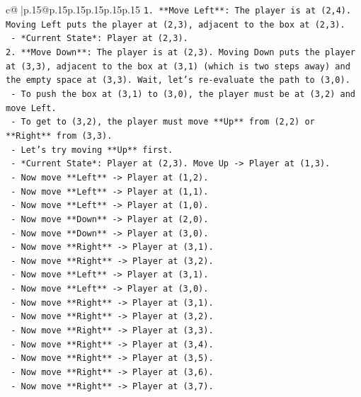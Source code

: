 \documentclass{article}
\begin{document}
{\begin{supertabular}{c@{$\;$}|p{.15\linewidth}@{}p{.15\linewidth}p{.15\linewidth}p{.15\linewidth}p{.15\linewidth}p{.15\linewidth}}
{{{\texttt{1.  **Move Left**: The player is at (2,4). Moving Left puts the player at (2,3), adjacent to the box at (2,3).} \\
\texttt{    {-}   *Current State*: Player at (2,3).} \\
\texttt{2.  **Move Down**: The player is at (2,3). Moving Down puts the player at (3,3), adjacent to the box at (3,1) (which is two steps away) and the empty space at (3,3). Wait, let's re{-}evaluate the path to (3,0).} \\
\texttt{    {-}   To push the box at (3,1) to (3,0), the player must be at (3,2) and move Left.} \\
\texttt{    {-}   To get to (3,2), the player must move **Up** from (2,2) or **Right** from (3,3).} \\
\texttt{    {-}   Let's try moving **Up** first.} \\
\texttt{    {-}   *Current State*: Player at (2,3). Move Up {-}> Player at (1,3).} \\
\texttt{    {-}   Now move **Left** {-}> Player at (1,2).} \\
\texttt{    {-}   Now move **Left** {-}> Player at (1,1).} \\
\texttt{    {-}   Now move **Left** {-}> Player at (1,0).} \\
\texttt{    {-}   Now move **Down** {-}> Player at (2,0).} \\
\texttt{    {-}   Now move **Down** {-}> Player at (3,0).} \\
\texttt{    {-}   Now move **Right** {-}> Player at (3,1).} \\
\texttt{    {-}   Now move **Right** {-}> Player at (3,2).} \\
\texttt{    {-}   Now move **Left** {-}> Player at (3,1).} \\
\texttt{    {-}   Now move **Left** {-}> Player at (3,0).} \\
\texttt{    {-}   Now move **Right** {-}> Player at (3,1).} \\
\texttt{    {-}   Now move **Right** {-}> Player at (3,2).} \\
\texttt{    {-}   Now move **Right** {-}> Player at (3,3).} \\
\texttt{    {-}   Now move **Right** {-}> Player at (3,4).} \\
\texttt{    {-}   Now move **Right** {-}> Player at (3,5).} \\
\texttt{    {-}   Now move **Right** {-}> Player at (3,6).} \\
\texttt{    {-}   Now move **Right** {-}> Player at (3,7).} \\
}}}
\end{supertabular}}
\end{document}
